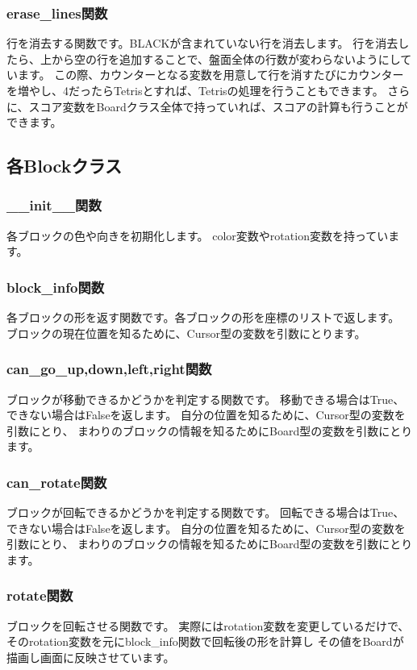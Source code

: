 \subsubsection{erase\_lines関数}
行を消去する関数です。BLACKが含まれていない行を消去します。
行を消去したら、上から空の行を追加することで、盤面全体の行数が変わらないようにしています。
この際、カウンターとなる変数を用意して行を消すたびにカウンターを増やし、4だったらTetrisとすれば、Tetrisの処理を行うこともできます。
さらに、スコア変数をBoardクラス全体で持っていれば、スコアの計算も行うことができます。

\subsection{各Blockクラス}
\subsubsection{\_\_init\_\_関数}
各ブロックの色や向きを初期化します。
color変数やrotation変数を持っています。

\subsubsection{block\_info関数}
各ブロックの形を返す関数です。各ブロックの形を座標のリストで返します。
ブロックの現在位置を知るために、Cursor型の変数を引数にとります。

\subsubsection{can\_go\_up,down,left,right関数}
ブロックが移動できるかどうかを判定する関数です。
移動できる場合はTrue、できない場合はFalseを返します。
自分の位置を知るために、Cursor型の変数を引数にとり、
まわりのブロックの情報を知るためにBoard型の変数を引数にとります。

\subsubsection{can\_rotate関数}
ブロックが回転できるかどうかを判定する関数です。
回転できる場合はTrue、できない場合はFalseを返します。
自分の位置を知るために、Cursor型の変数を引数にとり、
まわりのブロックの情報を知るためにBoard型の変数を引数にとります。

\subsubsection{rotate関数}
ブロックを回転させる関数です。
実際にはrotation変数を変更しているだけで、
そのrotation変数を元にblock\_info関数で回転後の形を計算し
その値をBoardが描画し画面に反映させています。

